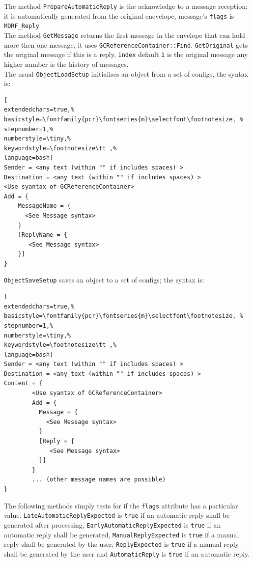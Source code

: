The method \texttt{PrepareAutomaticReply} is the acknowledge to a message reception; it is automatically generated from the original enevelope, message's \texttt{flags} is \texttt{MDRF\_Reply}.\\


The method \texttt{GetMessage} returns the first message in the envelope that can hold more then one message, it uses \texttt{GCReferenceContainer::Find}. \texttt{GetOriginal} gets the original message if this is a reply, \texttt{index} default \texttt{1} is the original message any higher number is the history of messages.\\


The usual \texttt{ObjectLoadSetup} initialises an object from a set of configs, the syntax is:
\begin{lstlisting}[
extendedchars=true,%
basicstyle=\fontfamily{pcr}\fontseries{m}\selectfont\footnotesize, %
stepnumber=1,%
numberstyle=\tiny,%
keywordstyle=\footnotesize\tt ,%
language=bash]
Sender = <any text (within "" if includes spaces) >
Destination = <any text (within "" if includes spaces) >
<Use syantax of GCReferenceContainer>
Add = {
    MessageName = {
      <See Message syntax>
    }
    [ReplyName = {
       <See Message syntax>
    }]
}
\end{lstlisting}
\texttt{ObjectSaveSetup} saves an object to a set of configs; the syntax is:
\begin{lstlisting}[
extendedchars=true,%
basicstyle=\fontfamily{pcr}\fontseries{m}\selectfont\footnotesize, %
stepnumber=1,%
numberstyle=\tiny,%
keywordstyle=\footnotesize\tt ,%
language=bash]
Sender = <any text (within "" if includes spaces) >
Destination = <any text (within "" if includes spaces) >
Content = {
        <Use syantax of GCReferenceContainer>
        Add = {
          Message = {
            <See Message syntax>
          }
          [Reply = {
             <See Message syntax>
          }]
        }
        ... (other message names are possible)
}
\end{lstlisting}
 
The following methods simply tests for if the \texttt{flags} attribute has a particular value. \texttt{LateAutomaticReplyExpected} is \texttt{true} if an automatic reply shall be generated after processing, \texttt{EarlyAutomaticReplyExpected} is \texttt{true} if an automatic reply shall be generated, \texttt{ManualReplyExpected} is \texttt{true} if a manual reply shall be generated by the user, \texttt{ReplyExpected} is \texttt{true} if a manual reply shall be generated by the user and \texttt{AutomaticReply} is \texttt{true} if an automatic reply.

